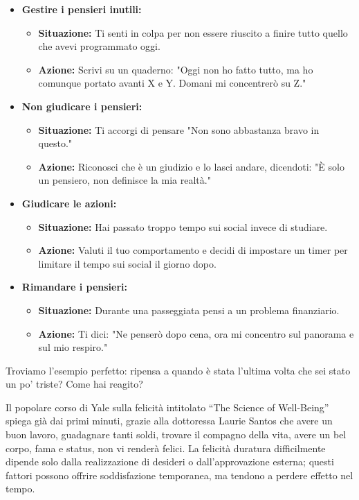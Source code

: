 \documentclass[12pt]{book} %
\begin{document}
\begin{mdframed}[linewidth=1pt]
\begin{itemize}
    \item \textbf{Gestire i pensieri inutili:} 
    \begin{itemize}
        \item \textbf{Situazione:} Ti senti in colpa per non essere riuscito a finire tutto quello che avevi programmato oggi.
        \item \textbf{Azione:} Scrivi su un quaderno: "Oggi non ho fatto tutto, ma ho comunque portato avanti X e Y. Domani mi concentrerò su Z."
    \end{itemize}

    \item \textbf{Non giudicare i pensieri:} 
    \begin{itemize}
        \item \textbf{Situazione:} Ti accorgi di pensare "Non sono abbastanza bravo in questo."
        \item \textbf{Azione:} Riconosci che è un giudizio e lo lasci andare, dicendoti: "È solo un pensiero, non definisce la mia realtà."
    \end{itemize}

    \item \textbf{Giudicare le azioni:} 
    \begin{itemize}
        \item \textbf{Situazione:} Hai passato troppo tempo sui social invece di studiare.
        \item \textbf{Azione:} Valuti il tuo comportamento e decidi di impostare un timer per limitare il tempo sui social il giorno dopo.
    \end{itemize}

    \item \textbf{Rimandare i pensieri:} 
    \begin{itemize}
        \item \textbf{Situazione:} Durante una passeggiata pensi a un problema finanziario.
        \item \textbf{Azione:} Ti dici: "Ne penserò dopo cena, ora mi concentro sul panorama e sul mio respiro."
    \end{itemize}
\end{itemize}

Troviamo l'esempio perfetto: ripensa a quando è stata l'ultima volta che sei stato un po' triste? Come hai reagito?
\end{mdframed}

Il popolare corso di Yale sulla felicità intitolato “The Science of
Well-Being” spiega già dai primi minuti, grazie
alla dottoressa Laurie Santos che avere un buon lavoro, guadagnare tanti soldi, trovare il compagno della vita, avere
un bel corpo, fama e status, non vi renderà felici. 
La felicità duratura difficilmente dipende solo dalla realizzazione di desideri o dall’approvazione esterna; questi fattori possono offrire soddisfazione temporanea, ma tendono a perdere effetto nel tempo.
\end{document}
